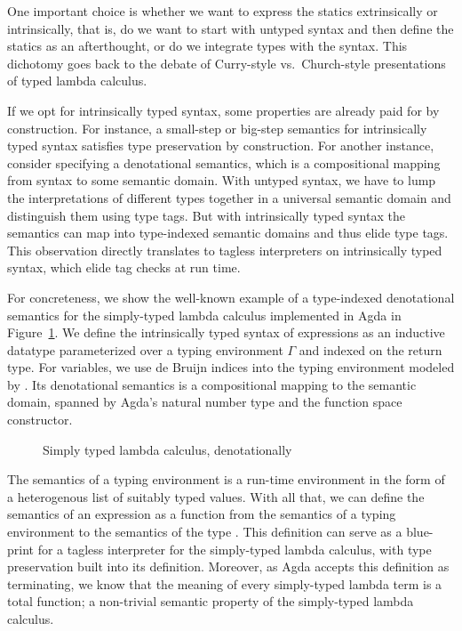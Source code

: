 \documentclass[sigplan,anonymous,review,screen]{acmart}
\begin{document}
One important choice is whether we want to express the statics
extrinsically or intrinsically, that is, do we want to start with
untyped syntax and then define the statics as an afterthought, or do
we integrate types with the syntax. This dichotomy goes back to the
debate of Curry-style vs.\ Church-style presentations of typed lambda
calculus.

If we opt for intrinsically typed syntax, some properties are already paid
for by construction. For instance, a small-step or big-step semantics
for intrinsically typed
syntax satisfies type preservation by construction. For another
instance, consider specifying a denotational semantics, which is a
compositional mapping from syntax to some semantic domain. With 
untyped syntax, we have to lump the interpretations of
different types together in a universal semantic domain and distinguish them using type tags. But
with intrinsically typed syntax the semantics can map into
type-indexed semantic domains 
and thus elide type tags. This observation directly translates to tagless interpreters
on intrinsically typed syntax, which elide tag checks at run time.

For concreteness, we show the well-known example of a type-indexed
denotational semantics for the simply-typed lambda calculus implemented in Agda in
Figure~\ref{fig:stlc}. 
We define the intrinsically typed syntax of expressions as an
inductive datatype  {\AExpr} parameterized over a typing environment $\Gamma$ and indexed on the return
type. For variables, we use de Bruijn indices into the typing
environment modeled by {\AVar}.
Its denotational semantics is a compositional mapping to the semantic domain, spanned by Agda's
natural number type and the function space constructor. 

\begin{figure}[tp]
  
  \caption{Simply typed lambda calculus, denotationally}
  \label{fig:stlc}
\end{figure}

The semantics of a typing environment is a run-time environment in the
form of a heterogenous list of suitably typed values. With all that,
we can define the semantics of an expression {\AESem} as a function from
the semantics of a typing environment {\AGSem} to the semantics of the type
{\ATSem}.  This definition can serve as a blue-print for a tagless interpreter for
the simply-typed lambda calculus, with type preservation
built into its definition. Moreover, as Agda accepts this
definition as terminating, we know that the meaning of every
simply-typed lambda term is a total function; a non-trivial semantic property
of the simply-typed lambda calculus.
\end{document}
